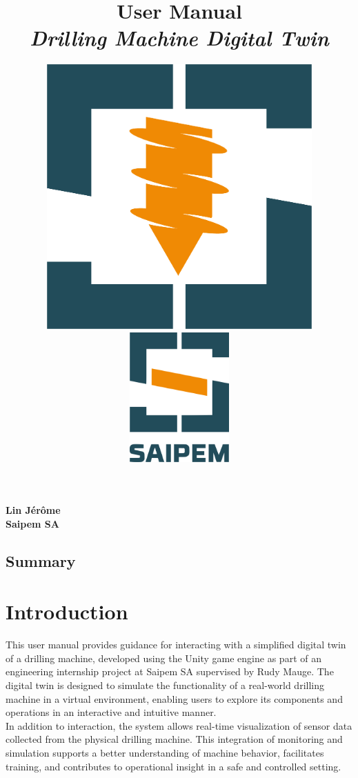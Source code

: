 \documentclass{article}
\title{\textbf{User Manual}\\
\textbf{\textit{Drilling Machine Digital Twin}}}
\author{
    \begin{minipage}[c]{\textwidth}
        \centering
        \includegraphics[width=4in]{DrillingMachineDigitaTwinLogo.png} \\
        \vspace{2cm}
        \includegraphics[width=1.5in]{SaipemLogo.png}
    \end{minipage}
}
\date{}
\begin{document}
\maketitle

\vfill
\begin{center}
    \textbf{Lin Jérôme}\\
    \textbf{Saipem SA}
\end{center}






\subsection*{Summary}
\tableofcontents





\newpage
\section{Introduction}\hfill

This user manual provides guidance for interacting with a simplified digital twin of a drilling machine, developed using the Unity game engine as part of an engineering internship project at Saipem SA supervised by Rudy Mauge. The digital twin is designed to simulate the functionality of a real-world drilling machine in a virtual environment, enabling users to explore its components and operations in an interactive and intuitive manner.\\

In addition to interaction, the system allows real-time visualization of sensor data collected from the physical drilling machine. This integration of monitoring and simulation supports a better understanding of machine behavior, facilitates training, and contributes to operational insight in a safe and controlled setting.





\newpage
\end{document}
